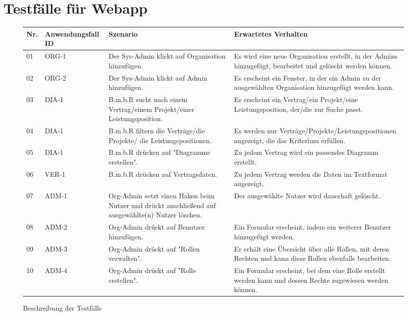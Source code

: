 \section{Testfälle für Webapp}
\begin{figure}[!h]
	\begin{center}
		\begin{tabularx}{\textwidth}{ p{} | p{} | p{} | X }
			\textbf{Nr.} & \textbf{Anwendungsfall ID} & \textbf{Szenario} & \textbf{Erwartetes Verhalten} \\ \hline
			01 & ORG-1 & Der Sys-Admin klickt auf Organisation hinzufügen. & Es wird eine neue Organisation erstellt, in der Admins hinzugefügt, bearbeitet und gelöscht werden können. \\ \hline
			02 & ORG-2 & Der Sys-Admin klickt auf Admin hinzufügen. & Es erscheint ein Fenster, in der ein Admin zu der ausgewählten Organisation hinzugefügt werden kann. \\ \hline
			03 & DIA-1 & B.m.b.R sucht nach einem Vertrag/einem Projekt/einer Leistungsposition. & Es erscheint ein Vertrag/ein Projekt/eine Leistungsposition, der/die zur Suche passt. \\ \hline
			04 & DIA-1 & B.m.b.R filtern die Verträge/die Projekte/ die Leistungspositionen. & Es werden nur Verträge/Projekte/Leistungspositionen angezeigt, die das Kriterium erfüllen. \\ \hline
			05 & DIA-1 & B.m.b.R drücken auf "Diagramme erstellen". & Zu jedem Vertrag wird ein passendes Diagramm erstellt. \\ \hline
			06 & VER-1 & B.m.b.R drücken auf Vertragsdaten. & Zu jedem Vertrag werden die Daten im Textformat angezeigt. \\ \hline 
			07 & ADM-1 & Org-Admin setzt einen Haken beim Nutzer und drückt anschließend auf ausgewählte(n) Nutzer löschen. & Der ausgewählte Nutzer wird dauerhaft gelöscht. \\ \hline
			08 & ADM-2 & Org-Admin drückt auf Benutzer hinzufügen. & Ein Formular erscheint, indem ein weiterer Benutzer hinzugefügt werden. \\ \hline
			09 & ADM-3 & Org-Admin drückt auf "Rollen verwalten". & Er erhält eine Übersicht über alle Rollen, mit deren Rechten und kann diese Rollen ebenfalls bearbeiten. \\ \hline
			10 & ADM-4 & Org-Admin drückt auf "Rolle erstellen". & Ein Formular erscheint, bei dem eine Rolle erstellt werden kann und dessen Rechte zugewiesen werden können. \\ \hline
		\end{tabularx}	
	\end{center}
	\caption{Beschreibung der Testfälle}
	\label{fig:testfaelle-web-app-tabelle}
\end{figure}

